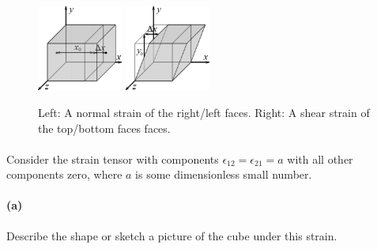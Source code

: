 \documentclass{article}
\begin{document}
	\begin{figure}[ht]	
	\centering
		\includegraphics[width = 0.25\textwidth]{89-PS7-P4-NormalStrain}	\qquad\qquad \includegraphics[width = 0.25\textwidth]{89-PS7-P4-ShearStrain}
	\caption{Left: A normal strain of the right/left faces.  Right:  A shear strain of the top/bottom faces faces.}
	\label{strains}
	\end{figure}

\phline
\paragraph{}
Consider the strain tensor with components $\epsilon_{12} = \epsilon_{21} = a$ with all other components zero, where $a$ is some dimensionless small number.

\paragraph{(a)}		\extrapart
Describe the shape or sketch a picture of the cube under this strain.


\end{document}
